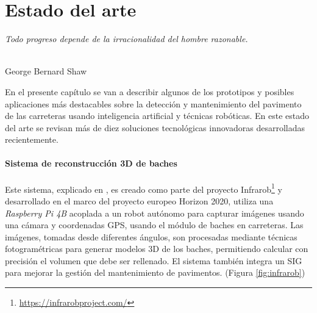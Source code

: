 \chapter{Estado del arte}
\label{cap:capitulo2}

\begin{flushright}
\begin{minipage}[]{10cm}
\emph{Todo progreso depende de la irracionalidad del hombre razonable.}\\
\end{minipage}\\

George Bernard Shaw\\
\end{flushright}

\vspace{1cm}

En el presente capítulo se van a describir algunos de los prototipos y posibles aplicaciones más destacables sobre la detección y mantenimiento del pavimento de las carreteras usando inteligencia artificial y técnicas robóticas. En este estado del arte se revisan más de diez soluciones tecnológicas innovadoras desarrolladas recientemente.
  


\subsubsection{Sistema de reconstrucción 3D de baches}

\setcounter{footnote}{26} 
Este sistema, explicado en \cite{s23135860}, es creado como parte del proyecto Infrarob\footnote{\url{https://infrarobproject.com/}} y desarrollado en el marco del proyecto europeo Horizon 2020, utiliza una \textit{Raspberry Pi 4B} acoplada a un robot autónomo para capturar imágenes usando una cámara y coordenadas \acs{GPS}, usando el módulo  de baches en carreteras. Las imágenes, tomadas desde diferentes ángulos, son procesadas mediante técnicas fotogramétricas para generar modelos 3D de los baches, permitiendo calcular con precisión el volumen que debe ser rellenado. El sistema también integra un \ac{SIG} para mejorar la gestión del mantenimiento de pavimentos. (Figura \ref{fig:infrarob})

